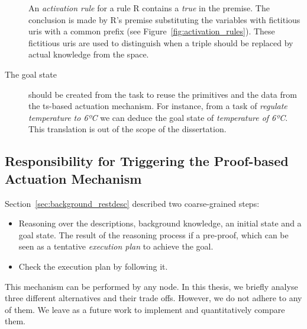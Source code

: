 \begin{description}

	An \emph{activation rule} for a rule R contains a \emph{true} in the premise.
	The conclusion is made by R's premise substituting the variables with fictitious \acsp{uri} with a common prefix (see Figure~\ref{fig:activation_rules}).
	These fictitious \acsp{uri} are used to distinguish when a triple should be replaced by actual knowledge from the space. %


  \item[The goal state] should be created from the task to reuse the primitives and the data from the \ac{ts}-based actuation mechanism.
	For instance, from a task of \emph{regulate temperature to 6ºC} we can deduce the goal state of \emph{temperature of 6ºC}.
	This translation is out of the scope of the dissertation.
\end{description}


\subsection{Responsibility for Triggering the Proof-based Actuation Mechanism}
\label{sec:responsible_proof}

Section~\ref{sec:background_restdesc} described two coarse-grained steps:
\begin{itemize}
  \item Reasoning over the descriptions, background knowledge, an initial state and a goal state.
        The result of the reasoning process if a pre-proof, which can be seen as a tentative \emph{execution plan} to achieve the goal.
  \item Check the execution plan by following it.
\end{itemize}


This mechanism can be performed by any node.
In this thesis, we briefly analyse three different alternatives and their trade offs.
However, we do not adhere to any of them.
We leave as a future work to implement and quantitatively compare them.

